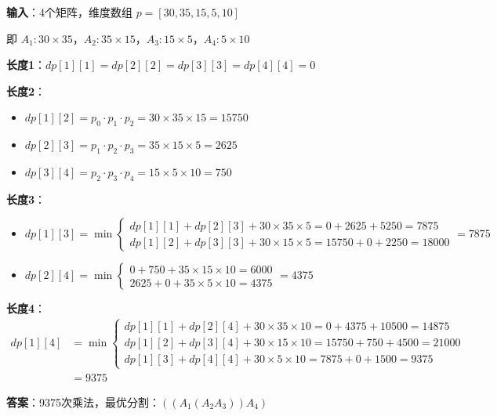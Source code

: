 \documentclass[12pt, a4paper]{ctexart}
\begin{document}
\begin{blackboard}[矩阵链乘法手算例子]

\textbf{输入}：4个矩阵，维度数组 $p = [30, 35, 15, 5, 10]$

即 $A_1: 30 \times 35$，$A_2: 35 \times 15$，$A_3: 15 \times 5$，$A_4: 5 \times 10$

\textbf{长度1}：$dp[1][1] = dp[2][2] = dp[3][3] = dp[4][4] = 0$

\textbf{长度2}：
\begin{itemize}
    \item $dp[1][2] = p_0 \cdot p_1 \cdot p_2 = 30 \times 35 \times 15 = 15750$
    \item $dp[2][3] = p_1 \cdot p_2 \cdot p_3 = 35 \times 15 \times 5 = 2625$
    \item $dp[3][4] = p_2 \cdot p_3 \cdot p_4 = 15 \times 5 \times 10 = 750$
\end{itemize}

\textbf{长度3}：
\begin{itemize}
    \item $dp[1][3] = \min\begin{cases} dp[1][1] + dp[2][3] + 30 \times 35 \times 5 = 0 + 2625 + 5250 = 7875 \\ dp[1][2] + dp[3][3] + 30 \times 15 \times 5 = 15750 + 0 + 2250 = 18000 \end{cases} = 7875$
    \item $dp[2][4] = \min\begin{cases} 0 + 750 + 35 \times 15 \times 10 = 6000 \\ 2625 + 0 + 35 \times 5 \times 10 = 4375 \end{cases} = 4375$
\end{itemize}

\textbf{长度4}：
\begin{align*}
dp[1][4] &= \min\begin{cases} 
dp[1][1] + dp[2][4] + 30 \times 35 \times 10 = 0 + 4375 + 10500 = 14875 \\
dp[1][2] + dp[3][4] + 30 \times 15 \times 10 = 15750 + 750 + 4500 = 21000 \\
dp[1][3] + dp[4][4] + 30 \times 5 \times 10 = 7875 + 0 + 1500 = 9375
\end{cases} \\
&= 9375
\end{align*}

\textbf{答案}：9375次乘法，最优分割：$((A_1(A_2 A_3))A_4)$

\end{blackboard}
\end{document}
